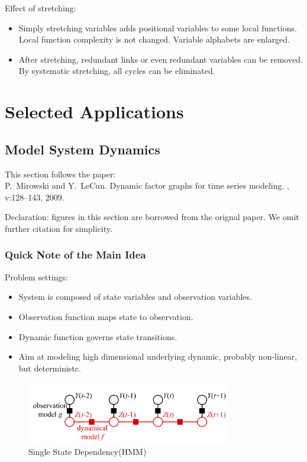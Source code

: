 \documentclass[11pt,a4paper]{article}
\begin{document}
Effect of stretching:
\begin{itemize}
	\item Simply stretching variables adds positional variables to some local functions.
	Local function complexity is not changed. Variable alphabets are enlarged. 
	\item After stretching, redundant links or even redundant variables can be removed. 
	By systematic stretching, all cycles can be eliminated. 
\end{itemize}



\section{Selected Applications}

\subsection{Model System Dynamics}
This section follows the paper:\\
P.~Mirowski and Y.~LeCun.
\newblock Dynamic factor graphs for time series modeling.
,
  v:128--143, 2009.
  
Declaration: figures in this section are borrowed from the orignal paper\cite{mirowski2009dynamic}. 
We omit further citation for simplicity.


\subsubsection{Quick Note of the Main Idea}

Problem settings:
\begin{itemize}
	\item System is composed of state variables and observation 
	variables. 
	\item Observation function maps state to observation. 
	\item Dynamic function governs state transitions. 
	\item Aim at modeling high dimensional underlying dynamic, 
	probably non-linear, but deterministc. 
\end{itemize}

\begin{figure}[htb]
\centering
	\includegraphics[width=0.8\textwidth]{fig/mirowski2009-HMM.png}
	\caption{Single State Dependency(HMM)}
\end{figure}	
\end{document}
